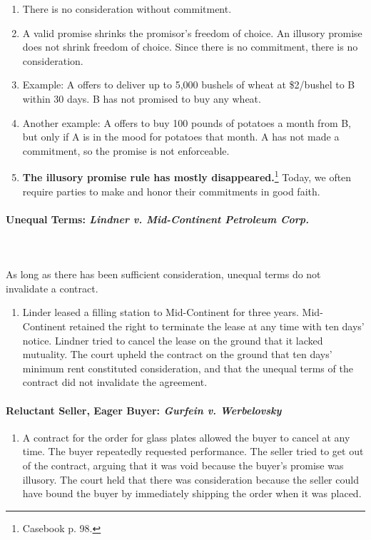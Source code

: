 \begin{enumerate}
    \item There is no consideration without commitment.
    \item A valid promise shrinks the promisor's freedom of choice. An 
    illusory promise does not shrink freedom of choice. Since there is no 
    commitment, there is no consideration.
    \item Example: A offers to deliver up to 5,000 bushels of wheat at 
    \$2/bushel to B within 30 days. B has not promised to buy any wheat.
    \item Another example: A offers to buy 100 pounds of potatoes a month from 
    B, but only if A is in the mood for potatoes that month. A has not made a 
    commitment, so the promise is not enforceable.
    \item \textbf{The illusory promise rule has mostly 
    disappeared.}\footnote{Casebook p. 98.} Today, we often require parties to 
    make and honor their commitments in good faith.
\end{enumerate}

\paragraph{Unequal Terms: \emph{Lindner v. Mid-Continent Petroleum Corp.}}
~\\\\
As long as there has been sufficient consideration, unequal terms do not 
invalidate a contract.

\begin{enumerate}
    \item Linder leased a filling station to Mid-Continent for three years. 
    Mid-Continent retained the right to terminate the lease at any time with 
    ten days' notice. Lindner tried to cancel the lease on the ground that it 
    lacked mutuality. The court upheld the contract on the ground that ten 
    days' minimum rent constituted consideration, and that the unequal terms 
    of the contract did not invalidate the agreement.
\end{enumerate}

\paragraph{Reluctant Seller, Eager Buyer: \emph{Gurfein v. Werbelovsky}}

\begin{enumerate}
    \item A contract for the order for glass plates allowed the buyer to 
    cancel at any time. The buyer repeatedly requested performance. The seller 
    tried to get out of the contract, arguing that it was void because the 
    buyer's promise was illusory. The court held that there was consideration 
    because the seller could have bound the buyer by immediately shipping the 
    order when it was placed.
\end{enumerate}

